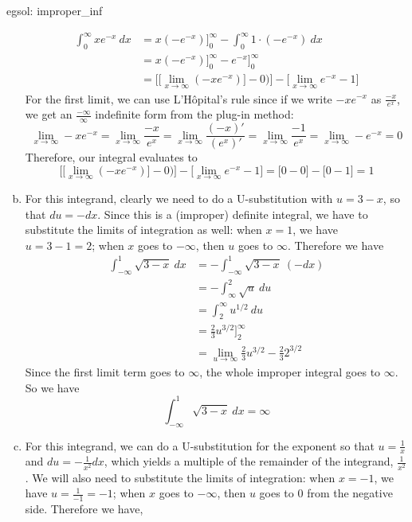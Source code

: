 \begin{egsol}[]{egsol: improper_inf}
\begin{enumerate}[a)]
        \begin{align*}
            \int_0^\infty xe^{-x}~dx &= x(-e^{-x})\Big]_0^\infty - \int_0^\infty 1\cdot(-e^{-x})~dx\\
            &= x(-e^{-x})\Big]_0^\infty - e^{-x}\Big]_0^\infty\\
            &= \Big[\big[\lim_{x \rightarrow \infty} (-xe^{-x})\big] - 0)\Big] - \Big[\lim_{x \rightarrow \infty} e^{-x} - 1\Big]
        \end{align*}
        For the first limit, we can use L'Hôpital's rule since if we write $-xe^{-x}$ as $\frac{-x}{e^x}$, we get an $\frac{-\infty}{\infty}$ indefinite form from the plug-in method:
        \[\lim_{x \rightarrow \infty} -xe^{-x} = \lim_{x \rightarrow \infty} \frac{-x}{e^x} = \lim_{x \rightarrow \infty} \frac{(-x)'}{(e^x)'} = \lim_{x \rightarrow \infty} \frac{-1}{e^x} = \lim_{x \rightarrow \infty} -e^{-x} = 0\]
        Therefore, our integral evaluates to 
        \[\Big[\big[\lim_{x \rightarrow \infty} (-xe^{-x})\big] - 0)\Big] - \Big[\lim_{x \rightarrow \infty} e^{-x} - 1\Big] = \Big[0 - 0\Big] - \Big[0 - 1\Big] = 1\]
        \item For this integrand, clearly we need to do a U-substitution with $u = 3-x$, so that $du = -dx$.  Since this is a (improper) definite integral, we have to substitute the limits of integration as well: when $x = 1$, we have $u = 3 - 1 = 2$; when $x$ goes to $-\infty$, then $u$ goes to $\infty$.  Therefore we have
        \begin{align*}
            \int_{-\infty}^1 \sqrt{3-x}~dx &= - \int_{-\infty}^1 \sqrt{3-x}~(-dx)\\
            &= - \int_{\infty}^2 \sqrt{u}~du\\
            &= \int_2^{\infty} u^{1/2}~du\\
            &= \frac{2}{3}u^{3/2}\Big]_2^{\infty}\\
            &= \lim_{u \rightarrow \infty} \frac{2}{3}u^{3/2} - \frac{2}{3} 2^{3/2}
        \end{align*}
        Since the first limit term goes to $\infty$, the whole improper integral goes to $\infty$.  So we have
        \[\int_{-\infty}^1 \sqrt{3-x}~dx = \infty\]
        \item For this integrand, we can do a U-substitution for the exponent so that $u = \frac{1}{x}$ and $du = -\frac{1}{x^2} dx$, which yields a multiple of the remainder of the integrand, $\frac{1}{x^2}$.  We will also need to substitute the limits of integration: when $x = -1$, we have $u = \frac{1}{-1} = -1$; when $x$ goes to $-\infty$, then $u$ goes to $0$ from the negative side.  Therefore we have,

\end{enumerate}
\end{egsol}
